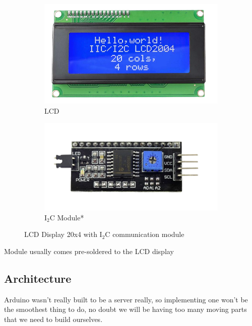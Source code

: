\begin{figure}[H]
    \centering
    \begin{subfigure}[b]{0.4\textwidth}
        \centering
        \includegraphics[width=\textwidth]{images/components/lcd_display_20x4.png}
         \caption{LCD}
    \end{subfigure}
    \hfill
    \begin{subfigure}[b]{0.49\textwidth}
        \centering
        \includegraphics[width=\textwidth]{images/components/i2c_lcd_module.png}
         \caption{I$_2$C Module*}
    \end{subfigure}
    \caption{LCD Display 20x4 with I$_2$C communication module}
\end{figure}
{\footnotesize * Module usually comes pre-soldered to the LCD display}

\subsection{Architecture}
Arduino wasn't really built to be a server really, so implementing one won't be the smoothest thing to do, no doubt we will be having too many moving parts that we need to build ourselves.


